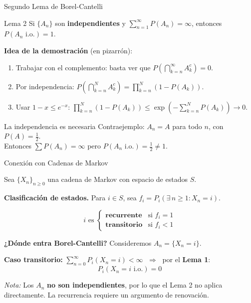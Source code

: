 \documentclass[11pt]{beamer}
\newcommand{\io}{\text{ i.o.}}
\begin{document}
\begin{frame}{Segundo Lema de Borel-Cantelli}

  \begin{block}{Lema 2}
    Si $\{A_n\}$ son \textbf{independientes} y
    $\displaystyle\sum_{n=1}^{\infty} P(A_n) = \infty$,
    entonces $P(A_n \io) = 1$.
  \end{block}

  \bigskip
  \textbf{Idea de la demostración} (en pizarrón):

  \medskip
  \begin{enumerate}
    \item Trabajar con el complemento: basta ver que
          $P\!\left(\bigcap_{k=n}^{\infty} A_k^c\right) = 0$.
    \item Por independencia:
          $P\!\left(\bigcap_{k=n}^{N} A_k^c\right)
          = \prod_{k=n}^{N}(1 - P(A_k))$.
    \item Usar $1 - x \leq e^{-x}$:
          $\displaystyle\prod_{k=n}^{N}(1-P(A_k))
          \leq \exp\!\left(-\sum_{k=n}^{N} P(A_k)\right) \to 0$.
  \end{enumerate}

  \bigskip
  \begin{alertblock}{La independencia es necesaria}
    Contraejemplo: $A_n = A$ para todo $n$, con $P(A) = \tfrac{1}{2}$.\\
    Entonces $\sum P(A_n) = \infty$ pero $P(A_n \io) = \tfrac{1}{2} \neq 1$.
  \end{alertblock}

\end{frame}

\begin{frame}{Conexión con Cadenas de Markov}

  Sea $\{X_n\}_{n \geq 0}$ una cadena de Markov con espacio de estados $S$.

  \medskip
  \textbf{Clasificación de estados.} Para $i \in S$, sea
  $f_i = P_i(\exists\, n \geq 1 : X_n = i)$.

  \[
    i \text{ es }
    \begin{cases}
      \textbf{recurrente} & \text{si } f_i = 1 \\[4pt]
      \textbf{transitorio} & \text{si } f_i < 1
    \end{cases}
  \]

  \medskip
  \textbf{¿Dónde entra Borel-Cantelli?} Consideremos $A_n = \{X_n = i\}$.

  \medskip
  \textbf{Caso transitorio:} $\displaystyle\sum_{n=0}^\infty P_i(X_n = i) < \infty$
  $\;\Rightarrow\;$ por el \textbf{Lema 1}:
  \[
    P_i(X_n = i \io) = 0
  \]

  \medskip
  \textit{Nota:} Los $A_n$ \textbf{no son independientes}, por lo que el
  Lema 2 no aplica directamente. La recurrencia requiere un argumento
  de renovación.

\end{frame}
\end{document}
